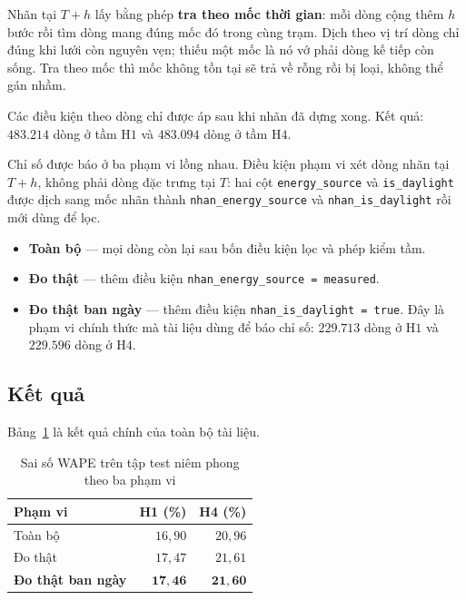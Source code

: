 \documentclass[12pt, a4paper]{report}
\begin{document}
Nhãn tại $T{+}h$ lấy bằng phép \textbf{tra theo mốc thời gian}: mỗi dòng cộng thêm $h$ bước rồi
tìm dòng mang đúng mốc đó trong cùng trạm. Dịch theo vị trí dòng chỉ đúng khi lưới còn nguyên
vẹn; thiếu một mốc là nó vớ phải dòng kế tiếp còn sống. Tra theo mốc thì mốc không tồn tại sẽ
trả về rỗng rồi bị loại, không thể gán nhầm.

Các điều kiện theo dòng chỉ được áp sau khi nhãn đã dựng xong. Kết quả: $483.214$ dòng
ở tầm H$1$ và $483.094$ dòng ở tầm H$4$.

Chỉ số được báo ở ba phạm vi lồng nhau. Điều kiện phạm vi xét dòng nhãn tại $T{+}h$,
không phải dòng đặc trưng tại $T$: hai cột \texttt{energy\_source} và \texttt{is\_daylight} được dịch
sang mốc nhãn thành \texttt{nhan\_energy\_source} và \texttt{nhan\_is\_daylight} rồi mới dùng để lọc.

\begin{itemize}
    \item \textbf{Toàn bộ} --- mọi dòng còn lại sau bốn điều kiện lọc và phép kiểm tầm.
    \item \textbf{Đo thật} --- thêm điều kiện \texttt{nhan\_energy\_source = measured}.
    \item \textbf{Đo thật ban ngày} --- thêm điều kiện \texttt{nhan\_is\_daylight = true}. Đây là
    phạm vi chính thức mà tài liệu dùng để báo chỉ số: $229.713$ dòng ở H$1$ và $229.596$ dòng
    ở H$4$.
\end{itemize}

\FloatBarrier
\subsection{Kết quả}

Bảng~\ref{tab:ket_qua_test} là kết quả chính của toàn bộ tài liệu.

\begin{table}[htbp]
\centering
\caption{Sai số WAPE trên tập test niêm phong theo ba phạm vi}
\label{tab:ket_qua_test}
\small
\begin{tabular}{l r r}
\toprule
\textbf{Phạm vi} & \textbf{H1 (\%)} & \textbf{H4 (\%)} \\
\midrule
Toàn bộ                   & $16{,}90$ & $20{,}96$ \\
Đo thật                   & $17{,}47$ & $21{,}61$ \\
\textbf{Đo thật ban ngày} & $\mathbf{17{,}46}$ & $\mathbf{21{,}60}$ \\
\bottomrule
\end{tabular}


\end{table}
\end{document}
